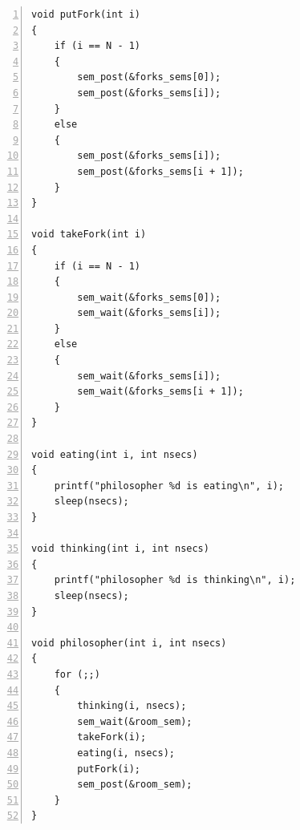 \documentclass[a4paper,twoside]{article}
\begin{document}
\begin{spacing}{1.2}
\begin{lstlisting}[numbers=left,style=CppStyle,caption=另一种实现,label={code:sem2}]
void putFork(int i)
{
	if (i == N - 1)
	{
		sem_post(&forks_sems[0]);
		sem_post(&forks_sems[i]);
	}
	else
	{
		sem_post(&forks_sems[i]);
		sem_post(&forks_sems[i + 1]);
	}
}

void takeFork(int i)
{
	if (i == N - 1)
	{
		sem_wait(&forks_sems[0]);
		sem_wait(&forks_sems[i]);
	}
	else
	{
		sem_wait(&forks_sems[i]);
		sem_wait(&forks_sems[i + 1]);
	}
}

void eating(int i, int nsecs)
{
	printf("philosopher %d is eating\n", i);
	sleep(nsecs);
}

void thinking(int i, int nsecs)
{
	printf("philosopher %d is thinking\n", i);
	sleep(nsecs);
}

void philosopher(int i, int nsecs)
{
	for (;;)
	{
		thinking(i, nsecs);
		sem_wait(&room_sem);
		takeFork(i);
		eating(i, nsecs);
		putFork(i);
		sem_post(&room_sem);
	}
}
\end{lstlisting}


\end{spacing}
\end{document}
